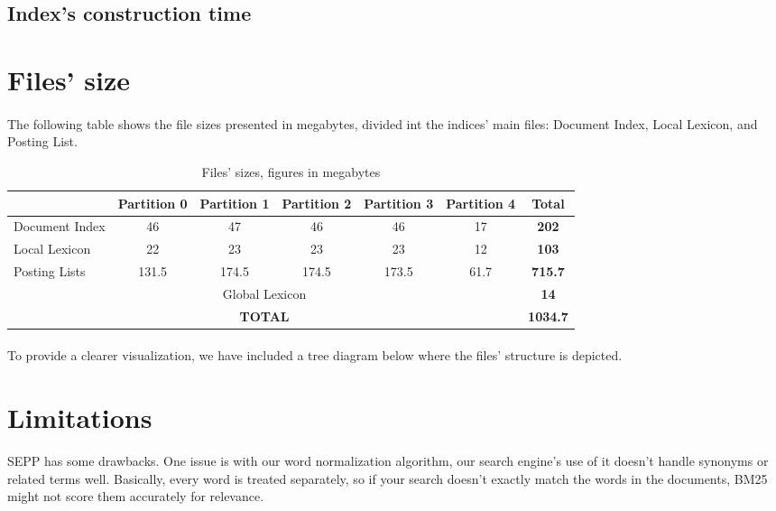 \subsection{Index's construction time}

	
\section{Files' size}

\paragraph{}
The following table shows the file sizes presented in megabytes, divided int the indices' main files: Document Index, Local Lexicon, and Posting List.

\begin{table}[H]
	\centering
	\begin{tabular}{|l|*{5}{c|}c|}
		\hline
		& \textbf{Partition 0} & \textbf{Partition 1} & \textbf{Partition 2} & \textbf{Partition 3} & \textbf{Partition 4} & \textbf{Total} \\
		\hline
		Document Index & 46 & 47 & 46 & 46 & 17 & \textbf{202} \\
		Local Lexicon & 22 & 23 & 23 & 23 & 12 & \textbf{103} \\
		Posting Lists & 131.5 & 174.5 & 174.5 & 173.5 & 61.7 & \textbf{715.7} \\
		\hline
		\multicolumn{6}{|c|}{Global Lexicon} & \textbf{14} \\
		\hline
		\multicolumn{6}{|c|}{\textbf{TOTAL}} & \textbf{1034.7} \\
		\hline
	\end{tabular}
	\caption{Files' sizes, figures in megabytes}
	\label{tab:spanning_table}
\end{table}

\paragraph{}
To provide a clearer visualization, we have included a tree diagram below where the files' structure is depicted.




\section{Limitations}
SEPP has some drawbacks. One issue is with our word normalization algorithm, our search engine's use of it doesn't handle synonyms or related terms well. Basically, every word is treated separately, so if your search doesn't exactly match the words in the documents, BM25 might not score them accurately for relevance.

